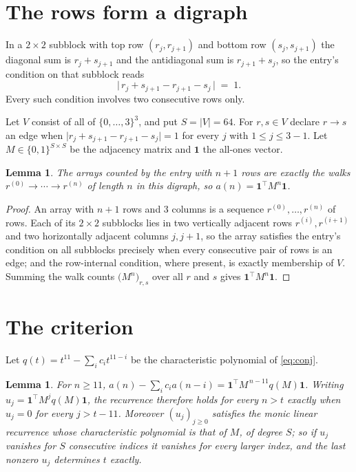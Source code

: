 \documentclass[11pt,a4paper]{article}
\theoremstyle{plain}
\newtheorem{lemma}[theorem]{Lemma}
\theoremstyle{definition}
\begin{document}
\section{The rows form a digraph}

In a $2\times2$ subblock with top row $(r_j,r_{j+1})$ and bottom row $(s_j,s_{j+1})$ the
diagonal sum is $r_j+s_{j+1}$ and the antidiagonal sum is $r_{j+1}+s_j$, so the entry's
condition on that subblock reads
\[
\bigl|\,r_j+s_{j+1}-r_{j+1}-s_j\,\bigr|\;=\;1.
\]
Every such condition involves two consecutive rows only.

Let $V$ consist of all of $\{0,\dots,3\}^{3}$, and put $S=|V|=64$. For $r,s\in V$ declare $r\to s$ an edge
when $\bigl|r_j+s_{j+1}-r_{j+1}-s_j\bigr|=1$ for every $j$ with
$1\le j\le3-1$. Let $M\in\{0,1\}^{S\times S}$ be the adjacency matrix and $\mathbf{1}$
the all-ones vector.

\begin{lemma}\label{lem:walk}
The arrays counted by the entry with $n+1$ rows are exactly the walks
$r^{(0)}\to\cdots\to r^{(n)}$ of length $n$ in this digraph, so
$a(n)=\mathbf{1}^{\!\top}M^{n}\mathbf{1}$.
\end{lemma}

\begin{proof}
An array with $n+1$ rows and $3$ columns is a sequence $r^{(0)},\dots,r^{(n)}$ of
rows. Each of its $2\times2$ subblocks lies in two vertically adjacent rows
$r^{(i)},r^{(i+1)}$ and two horizontally adjacent columns $j,j+1$, so the array satisfies
the entry's condition on all subblocks precisely when every consecutive pair of rows is an
edge; and the row-internal condition, where present, is exactly membership of $V$. Summing
the walk counts $\bigl(M^{n}\bigr)_{r,s}$ over all $r$ and $s$ gives
$\mathbf{1}^{\!\top}M^{n}\mathbf{1}$.
\end{proof}

\section{The criterion}

Let $q(t)=t^{11}-\sum_i c_i t^{11-i}$ be the characteristic polynomial of
\eqref{eq:conj}.

\begin{lemma}\label{lem:crit}
For $n\ge11$,
$a(n)-\sum_i c_i a(n-i)=\mathbf{1}^{\!\top}M^{\,n-11}q(M)\mathbf{1}$. Writing
$u_j=\mathbf{1}^{\!\top}M^{j}q(M)\mathbf{1}$, the recurrence therefore holds for every
$n>t$ exactly when $u_j=0$ for every $j>t-11$. Moreover $(u_j)_{j\ge0}$ satisfies the
monic linear recurrence whose characteristic polynomial is that of $M$, of degree $S$; so
if $u_j$ vanishes for $S$ consecutive indices it vanishes for every larger index, and the
last nonzero $u_j$ determines $t$ exactly.
\end{lemma}
\end{document}
